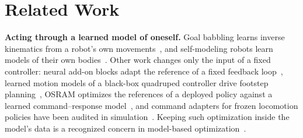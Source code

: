\documentclass[conference]{IEEEtran}
\begin{document}
\begin{figure}[t]
\label{fig:teaser}
\end{figure}

\section{Related Work}
\textbf{Acting through a learned model of oneself.} Goal babbling learns inverse kinematics from a robot's own movements~\cite{rolf2010,saggriac}, and self-modeling robots learn models of their own bodies~\cite{bongard2006}. Other work changes only the input of a fixed controller: neural add-on blocks adapt the reference of a fixed feedback loop~\cite{zhou2017dnn}, learned motion models of a black-box quadruped controller drive footstep planning~\cite{taouil2023}, OSRAM optimizes the references of a deployed policy against a learned command--response model~\cite{osram}, and command adapters for frozen locomotion policies have been audited in simulation~\cite{li2026audit}. Keeping such optimization inside the model's data is a recognized concern in model-based optimization~\cite{mins,lagrassa2024,osram}.
\end{document}
